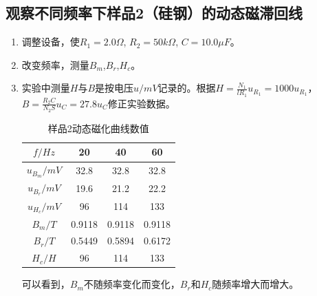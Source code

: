 \documentclass[11pt]{article}
\begin{document}
\subsection{观察不同频率下样品2（硅钢）的动态磁滞回线}
\begin{enumerate}
    \item 调整设备，使$R_1=2.0\Omega$, $R_2=50k\Omega$, $C=10.0\mu F$。
    \item 改变频率，测量$B_m$,$B_r$,$H_c$。
    \item 实验中测量$H$与$B$是按电压$u/mV$记录的。根据$H=\frac{N_1}{lR_1}u_{R_1}=1000u_{R_1}$，$B=\frac{R_2C}{N_2S}u_C=27.8u_C$修正实验数据。
        \begin{table}[H]
          \centering
          \caption{样品2动态磁化曲线数值}
            \begin{tabular}{|c|c|c|c|}\hline
            $f/Hz$    & 20   & 40   & 60 \\\hline
            $u_{B_m}/mV$   & 32.8   & 32.8   & 32.8 \\\hline
            $u_{B_r}/mV$   & 19.6   & 21.2   & 22.2 \\\hline
            $u_{H_c}/mV$   & 96     & 114    & 133 \\\hline
            $B_m/T$  & 0.9118  & 0.9118  & 0.9118  \\\hline
            $B_r/T$  & 0.5449  & 0.5894  & 0.6172  \\\hline
            $H_c/H$  & 96     & 114    & 133 \\\hline
            \end{tabular}%
          \label{tab:动态磁化2}%
        \end{table}%
    可以看到，$B_m$不随频率变化而变化，$B_r$和$H_c$随频率增大而增大。
\end{enumerate}
\end{document}
